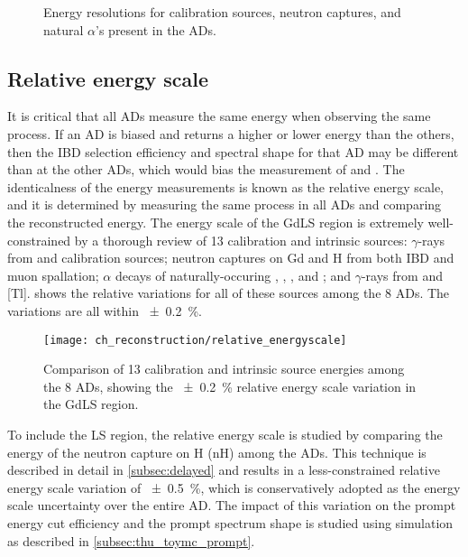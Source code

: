 \begin{figure}
    \caption{Energy resolutions for calibration sources, neutron captures,
        and natural $\alpha$'s present in the ADs.%
    }
    \label{fig:resolution}
\end{figure}


\subsection{Relative energy scale}
\label{subsec:rel_energyscale}

It is critical that all ADs measure the same energy when observing the same process.
If an AD is biased and returns a higher or lower energy than the others,
then the IBD selection efficiency and spectral shape for that AD
may be different than at the other ADs,
which would bias the measurement of \thetaot{} and \dmee{}.
The identicalness of the energy measurements is known as the relative energy scale,
and it is determined by measuring the same process in all ADs and comparing
the reconstructed energy.
The energy scale of the GdLS region is extremely well-constrained
by a thorough review of 13 calibration and intrinsic sources:
$\gamma$-rays from  and  calibration sources;
neutron captures on Gd and H from both IBD and muon spallation;
$\alpha$ decays of naturally-occuring ,
, , and ;
and $\gamma$-rays from  and [Tl].
 shows the relative variations
for all of these sources among the 8 ADs.
The variations are all within \SI{+-0.2}{\percent}.

\begin{figure}
    \centering
    \texttt{[image: ch\_reconstruction/relative\_energyscale]}
    \caption{
        Comparison of 13 calibration and intrinsic source energies
        among the 8 ADs, showing the \SI{+-0.2}{\percent}
        relative energy scale variation in the GdLS region.
    }
    \label{fig:gdls_rel_energyscale}
\end{figure}

To include the LS region, the relative energy scale is studied
by comparing the energy of the neutron capture on H (nH)
among the ADs.
This technique is described in detail in \cref{subsec:delayed}
and results in a less-constrained relative energy scale variation
of \SI{+-0.5}{\percent}, which is conservatively adopted
as the energy scale uncertainty over the entire AD.
The impact of this variation on the prompt energy cut efficiency
and the prompt spectrum shape
is studied using simulation
as described in \cref{subsec:thu_toymc_prompt}.

